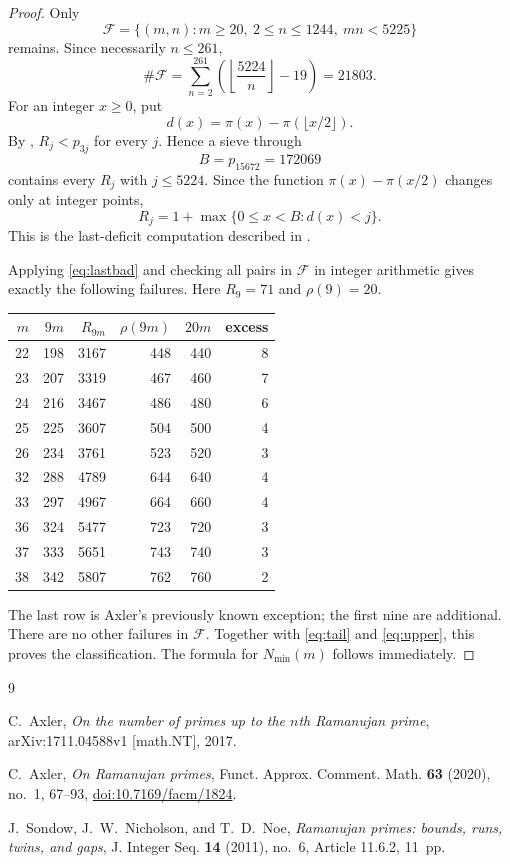 \documentclass[11pt]{amsart}
\begin{document}
\begin{proof}
Only
\[
 \mathcal F=\{(m,n):m\geq20,\ 2\leq n\leq1244,\ mn<5225\}
\]
remains.  Since necessarily $n\leq261$,
\[
 \#\mathcal F
 =\sum_{n=2}^{261}
   \left(\left\lfloor\frac{5224}{n}\right\rfloor-19\right)
 =21803.
\]
For an integer $x\geq0$, put
\[
 d(x)=\pi(x)-\pi(\lfloor x/2\rfloor).
\]
By \cite[Theorem~3]{SNN}, $R_j<p_{3j}$ for every $j$.  Hence a sieve
through
\[
 B=p_{15672}=172069
\]
contains every $R_j$ with $j\leq5224$.  Since the function
$\pi(x)-\pi(x/2)$ changes only at integer points,
\begin{equation}\label{eq:lastbad}
 R_j=1+\max\{0\leq x<B:d(x)<j\}.
\end{equation}
This is the last-deficit computation described in
\cite[Appendix]{SNN}.

Applying \eqref{eq:lastbad} and checking all pairs in $\mathcal F$ in
integer arithmetic gives exactly the following failures.  Here
$R_9=71$ and $\rho(9)=20$.
\begin{center}
\renewcommand{\arraystretch}{1.05}
\begin{tabular}{@{}rrrrrr@{}}
\toprule
$m$ & $9m$ & $R_{9m}$ & $\rho(9m)$ & $20m$ & excess \\
\midrule
22 & 198 & 3167 & 448 & 440 & 8 \\
23 & 207 & 3319 & 467 & 460 & 7 \\
24 & 216 & 3467 & 486 & 480 & 6 \\
25 & 225 & 3607 & 504 & 500 & 4 \\
26 & 234 & 3761 & 523 & 520 & 3 \\
32 & 288 & 4789 & 644 & 640 & 4 \\
33 & 297 & 4967 & 664 & 660 & 4 \\
36 & 324 & 5477 & 723 & 720 & 3 \\
37 & 333 & 5651 & 743 & 740 & 3 \\
38 & 342 & 5807 & 762 & 760 & 2 \\
\bottomrule
\end{tabular}
\end{center}
The last row is Axler's previously known exception; the first nine are
additional.  There are no other failures in $\mathcal F$.  Together with
\eqref{eq:tail} and \eqref{eq:upper}, this proves the classification.
The formula for $N_{\min}(m)$ follows immediately.
\end{proof}

\begin{thebibliography}{9}

C.~Axler,
\emph{On the number of primes up to the $n$th Ramanujan prime},
arXiv:1711.04588v1 [math.NT], 2017.

C.~Axler,
\emph{On Ramanujan primes},
Funct. Approx. Comment. Math. \textbf{63} (2020), no.~1, 67--93,
\href{https://doi.org/10.7169/facm/1824}{doi:10.7169/facm/1824}.

J.~Sondow, J.~W.~Nicholson, and T.~D.~Noe,
\emph{Ramanujan primes: bounds, runs, twins, and gaps},
J. Integer Seq. \textbf{14} (2011), no.~6, Article 11.6.2, 11~pp.

\end{thebibliography}
\end{document}
